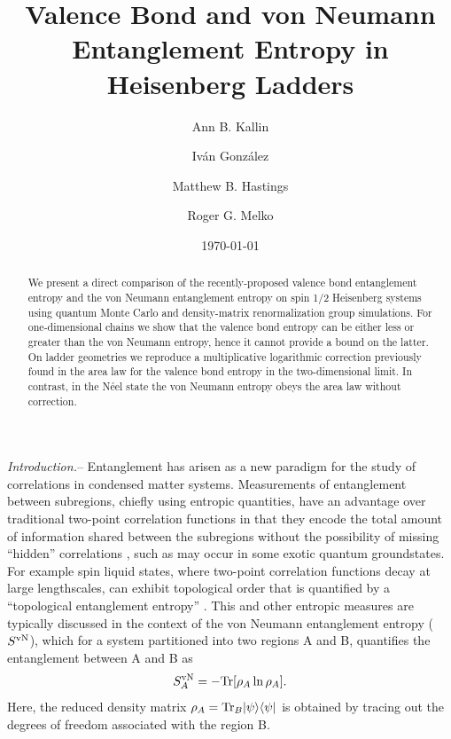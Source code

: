 \documentclass[prl,aps,twocolumn,floatfix,amsmath,amssymb,superscriptaddress,tightenlines]{revtex4}
\begin{document}
\date{\today}
\title{Valence Bond and von Neumann Entanglement Entropy in Heisenberg Ladders}
\author{Ann B. Kallin}

\author{Iv\'an Gonz\'alez}

\author{Matthew B. Hastings}

\author{Roger G. Melko}

\begin{abstract} We present a direct comparison of the recently-proposed
valence bond entanglement entropy and the von Neumann entanglement entropy on
spin 1/2 Heisenberg systems using quantum Monte Carlo and density-matrix
renormalization group simulations.  For one-dimensional chains we
show that the valence bond entropy can be either less or greater than the
von Neumann entropy, hence it cannot provide a bound on the latter.  On
ladder geometries we reproduce a multiplicative logarithmic correction
previously found in the area law for the valence bond entropy in the
two-dimensional limit.  In contrast, in the N\'eel state the von Neumann entropy
obeys the area law without correction.

\end{abstract}
\maketitle


{\it Introduction.}-- Entanglement has arisen 
as a new paradigm for the study of correlations in condensed matter systems.  
Measurements
of entanglement between subregions, chiefly using entropic
quantities, have an advantage over traditional two-point correlation
functions in that they encode the total amount of information shared
between the subregions without the possibility of missing ``hidden''
correlations \cite{wolf},
such as may occur in some exotic quantum groundstates.   For example spin liquid states, 
where two-point correlation functions decay at large lengthscales, can exhibit topological order that is quantified by a ``topological entanglement
entropy''  \cite{ KP}.
This and other entropic measures are typically discussed in the context of
the von Neumann entanglement entropy ($S^{\rm vN}$), which for a system partitioned into
two regions A and B, quantifies the entanglement between A and B as
\begin{equation} 
S^{\rm vN}_A = - {\rm Tr} [ \rho_A \ln \rho_A ]. \label{vNEE} 
\end{equation}
Here, the reduced density matrix $\rho_A = {\rm Tr}_B | \psi \rangle
\langle \psi |$ is obtained by tracing out the degrees of freedom
associated with the region B.
\end{document}
